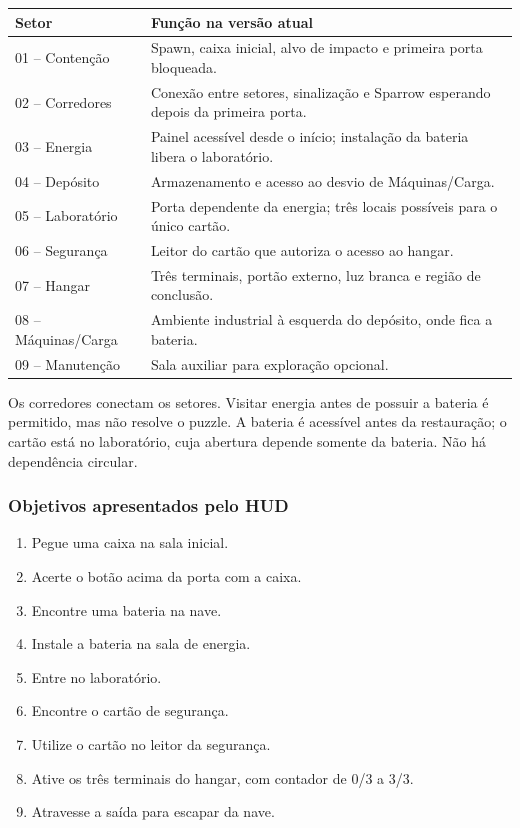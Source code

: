 \documentclass[12pt,a4paper]{article}
\begin{document}
\begin{center}
\begin{tabularx}{\textwidth}{|p{3.5cm}|X|}
\hline
\textbf{Setor} & \textbf{Função na versão atual}\\
\hline
01 -- Contenção & Spawn, caixa inicial, alvo de impacto e primeira porta bloqueada.\\
\hline
02 -- Corredores & Conexão entre setores, sinalização e Sparrow esperando depois da primeira porta.\\
\hline
03 -- Energia & Painel acessível desde o início; instalação da bateria libera o laboratório.\\
\hline
04 -- Depósito & Armazenamento e acesso ao desvio de Máquinas/Carga.\\
\hline
05 -- Laboratório & Porta dependente da energia; três locais possíveis para o único cartão.\\
\hline
06 -- Segurança & Leitor do cartão que autoriza o acesso ao hangar.\\
\hline
07 -- Hangar & Três terminais, portão externo, luz branca e região de conclusão.\\
\hline
08 -- Máquinas/Carga & Ambiente industrial à esquerda do depósito, onde fica a bateria.\\
\hline
09 -- Manutenção & Sala auxiliar para exploração opcional.\\
\hline
\end{tabularx}
\end{center}

Os corredores conectam os setores. Visitar energia antes de possuir
a bateria é permitido, mas não resolve o puzzle. A bateria é acessível
antes da restauração; o cartão está no laboratório, cuja abertura
depende somente da bateria. Não há dependência circular.

\subsubsection*{Objetivos apresentados pelo HUD}

\begin{enumerate}
\item Pegue uma caixa na sala inicial.
\item Acerte o botão acima da porta com a caixa.
\item Encontre uma bateria na nave.
\item Instale a bateria na sala de energia.
\item Entre no laboratório.
\item Encontre o cartão de segurança.
\item Utilize o cartão no leitor da segurança.
\item Ative os três terminais do hangar, com contador de 0/3 a 3/3.
\item Atravesse a saída para escapar da nave.
\end{enumerate}
\end{document}
